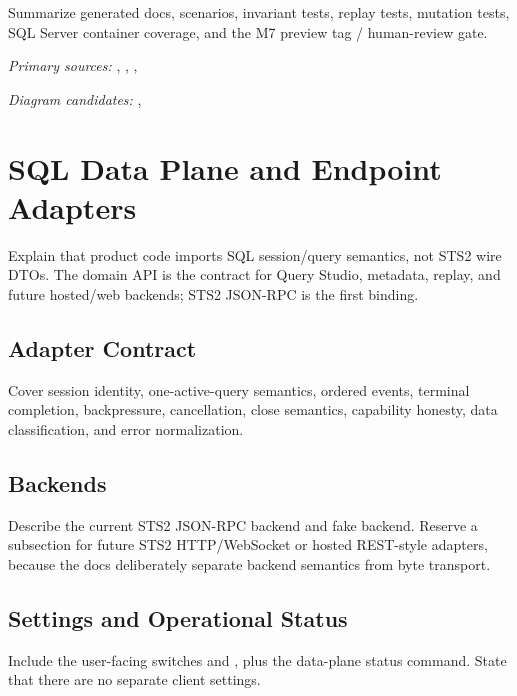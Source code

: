 \documentclass[11pt]{article}
\begin{document}
Summarize generated docs, scenarios, invariant tests, replay tests, mutation tests, SQL Server container coverage, and the M7 preview tag / human-review gate.

\noindent\textit{Primary sources:} , , , 

\noindent\textit{Diagram candidates:} , 

\section{SQL Data Plane and Endpoint Adapters}

Explain that product code imports SQL session/query semantics, not STS2 wire DTOs.  The domain API is the contract for Query Studio, metadata, replay, and future hosted/web backends; STS2 JSON-RPC is the first binding.

\subsection{Adapter Contract}

Cover session identity, one-active-query semantics, ordered events, terminal completion, backpressure, cancellation, close semantics, capability honesty, data classification, and error normalization.

\subsection{Backends}

Describe the current STS2 JSON-RPC backend and fake backend.  Reserve a subsection for future STS2 HTTP/WebSocket or hosted REST-style adapters, because the docs deliberately separate backend semantics from byte transport.

\subsection{Settings and Operational Status}

Include the user-facing switches  and , plus the data-plane status command.  State that there are no separate  client settings.
\end{document}
